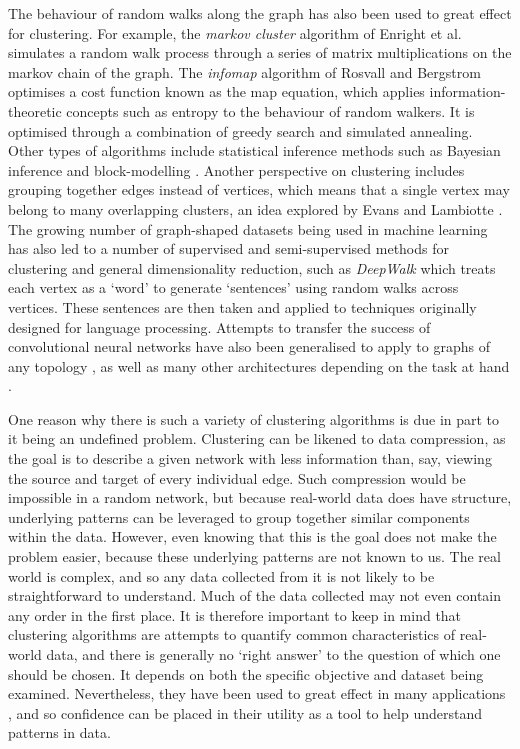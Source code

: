 The behaviour of random walks along the graph has also been used to great effect for clustering. For example, the \emph{markov cluster} algorithm of Enright et al.~\cite{Enright2002} simulates a random walk process through a series of matrix multiplications on the markov chain of the graph.
The \emph{infomap} algorithm of Rosvall and Bergstrom \cite{Rosvall2008} optimises a cost function known as the map equation, which applies information-theoretic concepts such as entropy to the behaviour of random walkers. It is optimised through a combination of greedy search and simulated annealing.
Other types of algorithms include statistical inference methods such as Bayesian inference \cite{Hastings2006} and block-modelling \cite{Reichardt2007}.
Another perspective on clustering includes grouping together edges instead of vertices, which means that a single vertex may belong to many overlapping clusters, an idea explored by Evans and Lambiotte \cite{Evans2009}.
The growing number of graph-shaped datasets being used in machine learning has also led to a number of supervised and semi-supervised methods for clustering and general dimensionality reduction, such as \emph{DeepWalk} \cite{Perozzi2014} which treats each vertex as a `word' to generate `sentences' using random walks across vertices. These sentences are then taken and applied to techniques originally designed for language processing. Attempts to transfer the success of convolutional neural networks have also been generalised to apply to graphs of any topology \cite{Kipf2016, LeCun2017}, as well as many other architectures depending on the task at hand \cite{Battaglia2018, Wu2020}.

One reason why there is such a variety of clustering algorithms is due in part to it being an undefined problem.
Clustering can be likened to data compression, as the goal is to describe a given network with less information than, say, viewing the source and target of every individual edge. Such compression would be impossible in a random network, but because real-world data does have structure, underlying patterns can be leveraged to group together similar components within the data.
However, even knowing that this is the goal does not make the problem easier, because these underlying patterns are not known to us. The real world is complex, and so any data collected from it is not likely to be straightforward to understand. Much of the data collected may not even contain any order in the first place.
It is therefore important to keep in mind that clustering algorithms are attempts to quantify common characteristics of real-world data, and there is generally no `right answer' to the question of which one should be chosen.
It depends on both the specific objective and dataset being examined. Nevertheless, they have been used to great effect in many applications \cite{Fortunato2016}, and so confidence can be placed in their utility as a tool to help understand patterns in data.

